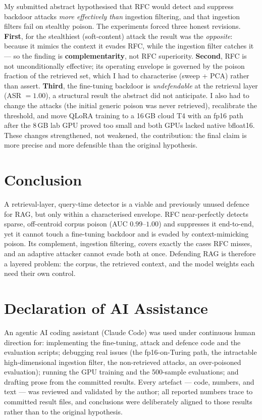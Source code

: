 \documentclass[11pt,a4paper]{article}
\begin{document}
My submitted abstract hypothesised that RFC would detect and suppress backdoor attacks
\emph{more effectively than} ingestion filtering, and that ingestion filters fail on
stealthy poison. The experiments forced three honest revisions. \textbf{First}, for the
stealthiest (soft-content) attack the result was the \emph{opposite}: because it mimics
the context it evades RFC, while the ingestion filter catches it --- so the finding is
\textbf{complementarity}, not RFC superiority. \textbf{Second}, RFC is not
unconditionally effective; its operating envelope is governed by the poison fraction of
the retrieved set, which I had to characterise (sweep + PCA) rather than assert.
\textbf{Third}, the fine-tuning backdoor is \emph{undefendable} at the retrieval layer
(ASR $=1.00$), a structural result the abstract did not anticipate. I also had to change
the attacks (the initial generic poison was never retrieved), recalibrate the threshold,
and move QLoRA training to a 16\,GB cloud T4 with an fp16 path after the 8\,GB lab GPU
proved too small and both GPUs lacked native bfloat16. These changes strengthened, not
weakened, the contribution: the final claim is more precise and more defensible than the
original hypothesis.

\section{Conclusion}

A retrieval-layer, query-time detector is a viable and previously unused defence for
RAG, but only within a characterised envelope. RFC near-perfectly detects sparse,
off-centroid corpus poison (AUC $0.99$--$1.00$) and suppresses it end-to-end, yet it
cannot touch a fine-tuning backdoor and is evaded by context-mimicking poison. Its
complement, ingestion filtering, covers exactly the cases RFC misses, and an adaptive
attacker cannot evade both at once. Defending RAG is therefore a layered problem: the
corpus, the retrieved context, and the model weights each need their own control.

\section*{Declaration of AI Assistance}
An agentic AI coding assistant (Claude Code) was used under continuous human direction
for: implementing the fine-tuning, attack and defence code and the evaluation scripts;
debugging real issues (the fp16-on-Turing path, the intractable high-dimensional
ingestion filter, the non-retrieved attacks, an over-poisoned evaluation); running the
GPU training and the 500-sample evaluations; and drafting prose from the committed
results. Every artefact --- code, numbers, and text --- was reviewed and validated by
the author; all reported numbers trace to committed result files, and conclusions were
deliberately aligned to those results rather than to the original hypothesis.

\printbibliography
\end{document}
